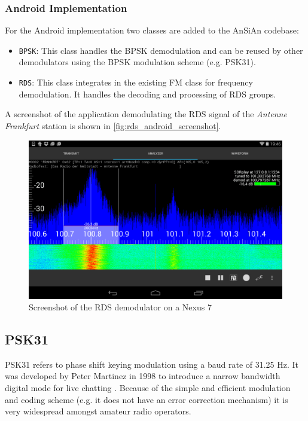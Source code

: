 \subsubsection{Android Implementation}

For the Android implementation two classes are added to the AnSiAn codebase:
\begin{itemize}
	\item \texttt{BPSK}: This class handles the \ac{BPSK} demodulation and can be
		reused by other demodulators using the \ac{BPSK} modulation scheme
		(e.g. PSK31).
	\item \texttt{RDS}: This class integrates in the existing FM class for frequency
		demodulation. It handles the decoding and processing of \ac{RDS}
		groups. 
\end{itemize}

A screenshot of the application demodulating the \ac{RDS} signal of the
\emph{Antenne Frankfurt} station is shown in \autoref{fig:rds_android_screenshot}.

\begin{figure}
	\centering
	\includegraphics[width=1\linewidth]{gfx/rds/android_screenshot.png}
	\caption{Screenshot of the RDS demodulator on a Nexus 7}
	\label{fig:rds_android_screenshot}
\end{figure}


\subsection{PSK31\label{sec:psk31}}

\ac{PSK31} refers to phase shift keying modulation using a baud rate of 31.25
Hz.  It was developed by Peter Martinez in 1998 to introduce a narrow bandwidth
digital mode for live chatting \cite{martinez1998psk31}. Because of the simple and efficient modulation
and coding scheme (e.g. it does not have an error correction mechanism) it is
very widespread amongst amateur radio operators.

